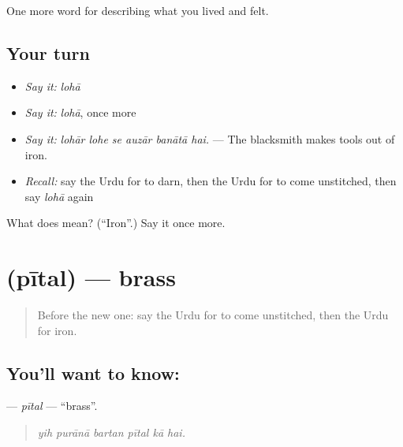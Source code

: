 \begin{grammarlens}[title={What you've built}]
One more word for describing what you lived and felt.
\end{grammarlens}

\subsection*{Your turn}
\begin{itemize}
\raggedright
  \item \emph{Say it:} \emph{lohā}
  \item \emph{Say it:} \emph{lohā}, once more
  \item \emph{Say it:} \emph{lohār lohe se auzār banātā hai.} — The blacksmith makes tools out of iron.
  \item \emph{Recall:} say the Urdu for to darn, then the Urdu for to come unstitched, then say \emph{lohā} again
\end{itemize}

\begin{tcolorbox}[breakable,colback=teal!4,colframe=teal!35!black,title={Before you move on}]
What does  mean? (\textquotedblleft{}Iron\textquotedblright{}.) Say it once more.
\end{tcolorbox}
\section[\texorpdfstring{\ur{پیتل} (pītal)}{پیتل (pītal)}]{ (pītal) — brass}

\label{lesson:UR-C501-pital}



\begin{quote}
Before the new one: say the Urdu for to come unstitched, then the Urdu for iron.
\end{quote}

\subsection*{You'll want to know: }
\textbf{} — \emph{pītal} — \textquotedblleft{}brass\textquotedblright{}.

\begin{quote}
     
\end{quote}

\begin{quote}
\emph{yih purānā bartan pītal kā hai.}
\end{quote}

